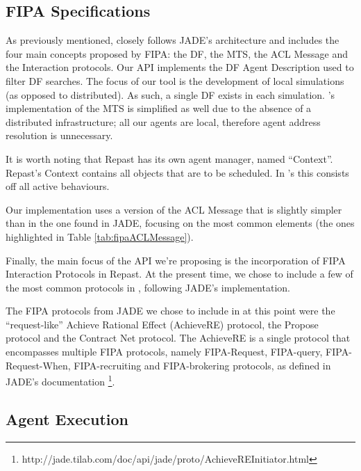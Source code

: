 \subsection{\gls{FIPA} Specifications}

As previously mentioned, \apiname{} closely follows JADE's architecture and includes the four main concepts proposed by \gls{FIPA}: the \gls{DF}, the \gls{MTS}, the ACL Message and the Interaction protocols.
Our API implements the DF Agent Description used to filter DF searches. The focus of our tool is the development of local simulations (as opposed to distributed). As such, a single DF exists in each simulation. \apiname{}'s implementation of the MTS is simplified as well due to the absence of a distributed infrastructure; all our agents are local, therefore agent address resolution is unnecessary.

It is worth noting that Repast has its own agent manager, named ``Context''.
Repast's Context contains all objects that are to be scheduled. In \apiname{}'s this consists off all active behaviours. 


Our implementation uses a version of the ACL Message that is slightly simpler than in the one found in JADE, focusing on the most common elements (the ones highlighted in Table \ref{tab:fipaACLMessage}).

Finally, the main focus of the API we're proposing is the incorporation of \gls{FIPA} Interaction Protocols in Repast. At the present time, we chose to include a few of the most common protocols in \apiname{}, following JADE's implementation.

The \gls{FIPA} protocols from JADE we chose to include in \apiname{} at this point were the ``request-like'' Achieve Rational Effect (AchieveRE) protocol, the Propose protocol and the Contract Net protocol. The AchieveRE is a single protocol that encompasses multiple \gls{FIPA} protocols, namely FIPA-Request, FIPA-query, FIPA-Request-When, FIPA-recruiting and FIPA-brokering protocols, as defined in JADE's documentation \footnote{http://jade.tilab.com/doc/api/jade/proto/AchieveREInitiator.html}.


\subsection{Agent Execution}

